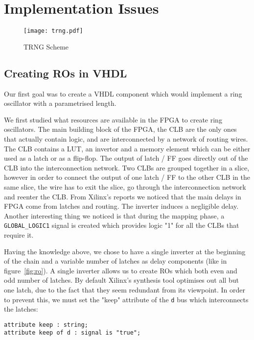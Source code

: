 \documentclass[conference]{IEEEtran}
\begin{document}
\section{Implementation Issues}

\begin{figure*}[t]
\centering
\texttt{[image: trng.pdf]}
\caption{TRNG Scheme}
\label{fig:trng}
\end{figure*}

\subsection{Creating ROs in VHDL}
Our first goal was to create a VHDL component which would implement a ring oscillator with a parametrised length.

We first studied what resources are available in the FPGA to create ring oscillators. The main building block of the FPGA, the CLB are the only ones that actually contain logic, and are interconnected by a network of routing wires. The CLB contains a LUT, an invertor and a memory element which can be either used as a latch or as a flip-flop. The output of latch / FF goes directly out of the CLB into the interconnection network. Two CLBs are grouped together in a slice, however in order to connect the output of one latch / FF to the other CLB in the same slice, the wire has to exit the slice, go through the interconnection network and reenter the CLB. From Xilinx's reports we noticed that the main delays in FPGA come from latches and routing. The inverter induces a negligible delay. Another interesting thing we noticed is that during the mapping phase, a {\tt GLOBAL\_LOGIC1} signal is created which provides logic "1" for all the CLBs that require it.

Having the knowledge above, we chose to have a single inverter at the beginning of the chain and a variable number of latches as delay components (like in figure~\ref{fig:ro}). A single inverter allows us to create ROs which both even and odd number of latches. By default Xilinx's synthesis tool optimises out all but one latch, due to the fact that they seem redundant from its viewpoint. In order to prevent this, we must set the "keep" attribute\cite{XiKeep} of the {\tt d} bus which interconnects the latches:

\begin{verbatim}
attribute keep : string;
attribute keep of d : signal is "true";
\end{verbatim}
\end{document}
